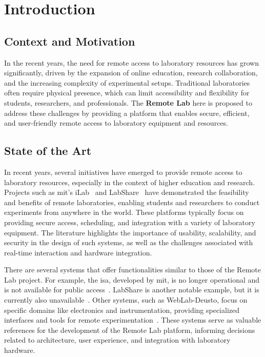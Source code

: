 %
%
\chapter{Introduction} \label{cap:intro}

%
%
\section{Context and Motivation} \label{sec11}
In the recent years, the need for remote access to laboratory resources has grown significantly, driven by the expansion of online education, research collaboration, and the increasing complexity of experimental setups. Traditional laboratories often require physical presence, which can limit accessibility and flexibility for students, researchers, and professionals.
The \textbf{Remote Lab} here is proposed to address these challenges by providing a platform that enables secure, efficient, and user-friendly remote access to laboratory equipment and resources.

\section{State of the Art}

In recent years, several initiatives have emerged to provide remote access to laboratory resources, especially in the context of higher education and research. Projects such as \acs{mit}'s iLab~\cite{ilab} and LabShare~\cite{labshare} have demonstrated the feasibility and benefits of remote laboratories, enabling students and researchers to conduct experiments from anywhere in the world. These platforms typically focus on providing secure access, scheduling, and integration with a variety of laboratory equipment. The literature highlights the importance of usability, scalability, and security in the design of such systems, as well as the challenges associated with real-time interaction and hardware integration.

There are several systems that offer functionalities similar to those of the Remote Lab project. For example, the \acs{isa}, developed by \acs{mit}, is no longer operational and is not available for public access~\cite{ilab}. LabShare is another notable example, but it is currently also unavailable~\cite{labshare}. Other systems, such as WebLab-Deusto, focus on specific domains like electronics and instrumentation, providing specialized interfaces and tools for remote experimentation~\cite{weblabdeusto}. These systems serve as valuable references for the development of the Remote Lab platform, informing decisions related to architecture, user experience, and integration with laboratory hardware.

